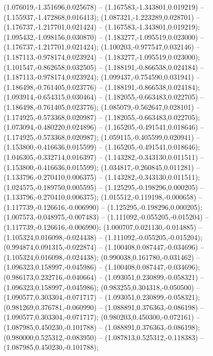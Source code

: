  (1.076019,-1.351696,0.025678) -- (1.167583,-1.343801,0.019219) -- (1.155937,-1.472868,0.016413);
 (1.087321,-1.223289,0.028701) -- (1.176737,-1.217701,0.021424) -- (1.167583,-1.343801,0.019219);
 (1.095432,-1.098156,0.030870) -- (1.183277,-1.095519,0.023000) -- (1.176737,-1.217701,0.021424);
 (1.100203,-0.977547,0.032146) -- (1.187113,-0.978174,0.023924) -- (1.183277,-1.095519,0.023000);
 (1.101547,-0.862658,0.032505) -- (1.188191,-0.866538,0.024184) -- (1.187113,-0.978174,0.023924);
 (1.099437,-0.754590,0.031941) -- (1.186498,-0.761405,0.023776) -- (1.188191,-0.866538,0.024184);
 (1.093914,-0.654315,0.030464) -- (1.182055,-0.663483,0.022705) -- (1.186498,-0.761405,0.023776);
 (1.085079,-0.562647,0.028101) -- (1.174925,-0.573368,0.020987) -- (1.182055,-0.663483,0.022705);
 (1.073094,-0.480220,0.024896) -- (1.165205,-0.491541,0.018646) -- (1.174925,-0.573368,0.020987);
 (1.059115,-0.405599,0.020941) -- (1.153800,-0.416636,0.015599) -- (1.165205,-0.491541,0.018646);
 (1.046305,-0.332714,0.016397) -- (1.143282,-0.343130,0.011511) -- (1.153800,-0.416636,0.015599);
 (1.034817,-0.260845,0.011281) -- (1.133796,-0.270410,0.006375) -- (1.143282,-0.343130,0.011511);
 (1.024575,-0.189750,0.005595) -- (1.125295,-0.198296,0.000205) -- (1.133796,-0.270410,0.006375);
 (1.015512,-0.119198,-0.000658) -- (1.117739,-0.126616,-0.006990) -- (1.125295,-0.198296,0.000205);
 (1.007573,-0.048975,-0.007483) -- (1.111092,-0.055205,-0.015204) -- (1.117739,-0.126616,-0.006990);
 (1.000707,0.021130,-0.014885) -- (1.105324,0.016098,-0.024438) -- (1.111092,-0.055205,-0.015204);
 (0.994874,0.091315,-0.022874) -- (1.100408,0.087447,-0.034696) -- (1.105324,0.016098,-0.024438);
 (0.990038,0.161780,-0.031462) -- (1.096323,0.158997,-0.045986) -- (1.100408,0.087447,-0.034696);
 (0.986173,0.232716,-0.040664) -- (1.093051,0.230899,-0.058321) -- (1.096323,0.158997,-0.045986);
 (0.983255,0.304318,-0.050500) -- (1.090577,0.303304,-0.071717) -- (1.093051,0.230899,-0.058321);
 (0.981269,0.376781,-0.060990) -- (1.088891,0.376363,-0.086198) -- (1.090577,0.303304,-0.071717);
 (0.980203,0.450300,-0.072161) -- (1.087985,0.450230,-0.101788) -- (1.088891,0.376363,-0.086198);
 (0.980000,0.525312,-0.083950) -- (1.087813,0.525312,-0.118383) -- (1.087985,0.450230,-0.101788);
